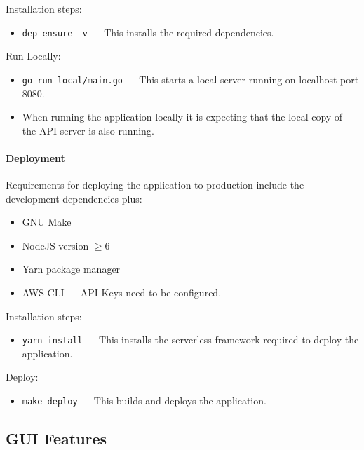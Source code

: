 \documentclass[a4paper,11pt]{article}
\def\code#1{\texttt{#1}}
\begin{document}
\noindent{}
Installation steps:

\begin{itemize}
  \item \code{dep ensure -v} --- This installs the required dependencies.
\end{itemize}

\noindent{}
Run Locally:

\begin{itemize}
  \item \code{go run local/main.go} --- This starts a local server running on
    localhost port 8080.
  \item When running the application locally it is expecting that the local copy
    of the API server is also running.
\end{itemize}

\paragraph{Deployment}

Requirements for deploying the application to production include the development
dependencies plus:

\begin{itemize}
  \item GNU Make \autocite{gnu:15}
  \item NodeJS version $\geq 6$ \autocite{node:16}
  \item Yarn package manager \autocite{yarn:17}
  \item AWS CLI \autocite{aws:18} --- API Keys need to be configured.
\end{itemize}

\noindent{}
Installation steps:

\begin{itemize}
  \item \code{yarn install} --- This installs the serverless framework required
    to deploy the application.
\end{itemize}

\noindent{}
Deploy:

\begin{itemize}
  \item \code{make deploy} --- This builds and deploys the application.
\end{itemize}

\subsection{GUI Features}
\end{document}
